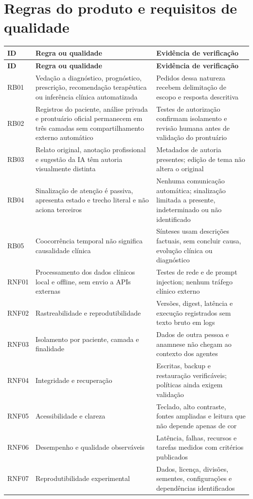\documentclass[11pt,a4paper]{article}
\begin{document}
\section{Regras do produto e requisitos de qualidade}
\begingroup\small
\begin{longtable}{>{\raggedright\arraybackslash}p{}>{\raggedright\arraybackslash}p{}>{\raggedright\arraybackslash}p{}}
\toprule
\textbf{ID} & \textbf{Regra ou qualidade} & \textbf{Evidência de verificação} \\ \midrule\endfirsthead
\toprule
\textbf{ID} & \textbf{Regra ou qualidade} & \textbf{Evidência de verificação} \\ \midrule\endhead
\bottomrule\endfoot
RB01 & Vedação a diagnóstico, prognóstico, prescrição, recomendação terapêutica ou inferência clínica automatizada & Pedidos dessa natureza recebem delimitação de escopo e resposta descritiva \\[3pt]
RB02 & Registros do paciente, análise privada e prontuário oficial permanecem em três camadas sem compartilhamento externo automático & Testes de autorização confirmam isolamento e revisão humana antes de validação do prontuário \\[3pt]
RB03 & Relato original, anotação profissional e sugestão da IA têm autoria visualmente distinta & Metadados de autoria presentes; edição de tema não altera o original \\[3pt]
RB04 & Sinalização de atenção é passiva, apresenta estado e trecho literal e não aciona terceiros & Nenhuma comunicação automática; sinalização limitada a presente, indeterminado ou não identificado \\[3pt]
RB05 & Coocorrência temporal não significa causalidade clínica & Sínteses usam descrições factuais, sem concluir causa, evolução clínica ou diagnóstico \\[3pt]
RNF01 & Processamento dos dados clínicos local e offline, sem envio a APIs externas & Testes de rede e de prompt injection; nenhum tráfego clínico externo \\[3pt]
RNF02 & Rastreabilidade e reprodutibilidade & Versões, digest, latência e execução registrados sem texto bruto em logs \\[3pt]
RNF03 & Isolamento por paciente, camada e finalidade & Dados de outra pessoa e anamnese não chegam ao contexto dos agentes \\[3pt]
RNF04 & Integridade e recuperação & Escritas, backup e restauração verificáveis; políticas ainda exigem validação \\[3pt]
RNF05 & Acessibilidade e clareza & Teclado, alto contraste, fontes ampliadas e leitura que não depende apenas de cor \\[3pt]
RNF06 & Desempenho e qualidade observáveis & Latência, falhas, recursos e tarefas medidos com critérios publicados \\[3pt]
RNF07 & Reprodutibilidade experimental & Dados, licença, divisões, sementes, configurações e dependências identificados \\[3pt]
\end{longtable}
\end{document}
